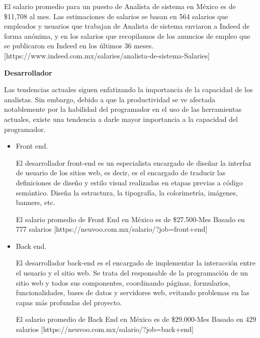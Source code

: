 El salario promedio para un puesto de Analista de sistema en México es de \$11,708 al mes. Las estimaciones de salarios se basan en 564 salarios que empleados y usuarios que trabajan de Analista de sistema enviaron a Indeed de forma anónima, y en los salarios que recopilamos de los anuncios de empleo que se publicaron en Indeed en los últimos 36 meses. [https://www.indeed.com.mx/salaries/analista-de-sistema-Salaries]

\textbf{Desarrollador}

Las tendencias actuales siguen enfatizando la importancia de la capacidad de los analistas. Sin embargo, debido a que la productividad se ve afectada notablemente por la habilidad del programador en el uso de las herramientas actuales, existe una tendencia a darle mayor importancia a la capacidad del programador. 

\begin{itemize}	
	\item Front end.
	
	\noindent El desarrollador front-end es un especialista encargado de diseñar la interfaz de usuario de los sitios web, es decir, es el encargado de traducir las definiciones de diseño y estilo visual realizadas en etapas previas a código semántico. Diseña la estructura, la tipografía, la colorimetría, imágenes, banners, etc. 
	
	El salario promedio de Front End en México es de \$27.500-Mes Basado en 777 salarios [https://neuvoo.com.mx/salario/?job=front+end]
	
	\item Back end.
	
	\noindent El desarrollador back-end es el encargado de implementar la interacción entre el usuario y el sitio web. Se trata del responsable de la programación de un sitio web y todos sus componentes, coordinando páginas, formularios, funcionalidades, bases de datos y servidores web, evitando problemas en las capas más profundas del proyecto. 
	
	El salario promedio de Back End en México es de \$29.000-Mes Basado en 429 salarios [https://neuvoo.com.mx/salario/?job=back+end]
\end{itemize}

